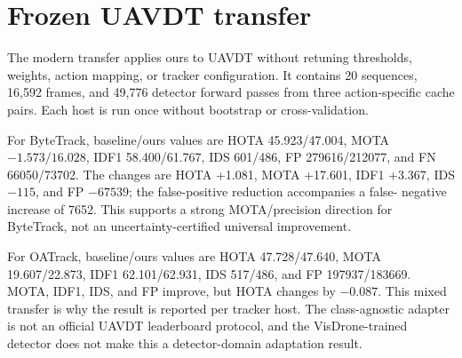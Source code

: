 \section{Frozen UAVDT transfer}
The modern transfer applies ours to UAVDT without retuning thresholds,
weights, action mapping, or tracker configuration. It contains 20 sequences,
16,592 frames, and 49,776 detector forward passes from three action-specific
cache pairs. Each host is run once without bootstrap or cross-validation.

For ByteTrack, baseline/ours values are HOTA 45.923/47.004, MOTA
$-1.573/16.028$, IDF1 58.400/61.767, IDS 601/486, FP 279616/212077, and FN
66050/73702. The changes are HOTA +1.081, MOTA +17.601, IDF1 +3.367, IDS
$-115$, and FP $-67539$; the false-positive reduction accompanies a false-
negative increase of 7652. This supports a strong MOTA/precision direction for
ByteTrack, not an uncertainty-certified universal improvement.

For OATrack, baseline/ours values are HOTA 47.728/47.640, MOTA 19.607/22.873,
IDF1 62.101/62.931, IDS 517/486, and FP 197937/183669. MOTA, IDF1, IDS, and
FP improve, but HOTA changes by $-0.087$. This mixed transfer is why the result
is reported per tracker host. The class-agnostic adapter is not an official
UAVDT leaderboard protocol, and the VisDrone-trained detector does not make this
a detector-domain adaptation result.
